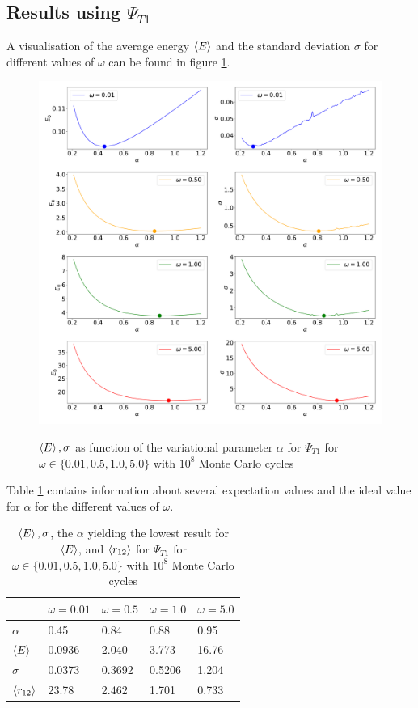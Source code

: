 \documentclass[10pt,a4paper]{article}
\begin{document}
\subsection{Results using $\Psi_{T1}$}
A visualisation of the average energy $\braket{E}$ and the standard deviation $\sigma$ for different values of $\omega$ can be found in figure \ref{function1_plot}. 
\begin{figure}[H]
\centering
\includegraphics[width=\textwidth]{function1_plot.pdf}\label{function1_plot}
\caption[$\braket{E},\sigma$ as function of $\alpha$]{$\braket{E},\sigma$ as function of the variational parameter $\alpha$ for $\Psi_{T1}$ for $\omega\in\{0.01,0.5,1.0,5.0\}$ with $10^8$ Monte Carlo cycles}
\end{figure}
Table \ref{table1} contains information about several expectation values and the ideal value for $\alpha$ for the different values of $\omega$.
\begin{table}[H]
\centering
\caption[$\braket{E},\sigma$, $\alpha$ and $\braket{r_{12}}$]{$\braket{E},\sigma$, the $\alpha$ yielding the lowest result for  $\braket{E}$, and $\braket{r_{12}}$ for $\Psi_{T1}$ for $\omega\in\{0.01,0.5,1.0,5.0\}$ with $10^8$ Monte Carlo cycles}
\begin{tabular}{|l|l|l|l|l|}
\hline
                  & $\omega=0.01$ & $\omega=0.5$ & $\omega=1.0$ & $\omega=5.0$ \\ \hline
$\alpha$          & 0.45          & 0.84         & 0.88         & 0.95         \\ \hline
$\braket{E}$      & 0.0936        & 2.040        & 3.773        & 16.76        \\ \hline
$\sigma$          & 0.0373        & 0.3692       & 0.5206       & 1.204        \\ \hline
$\braket{r_{12}}$ & 23.78         & 2.462        & 1.701        & 0.733        \\ \hline
\end{tabular}\label{table1}
\end{table}
\end{document}
